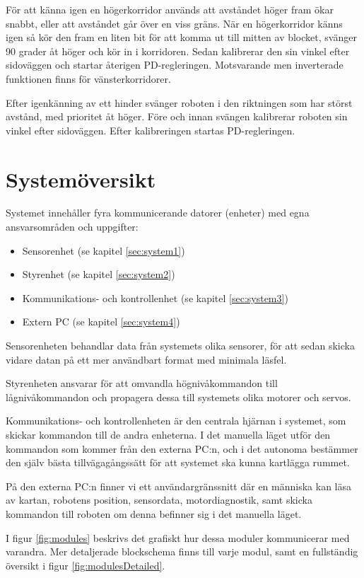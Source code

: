 \documentclass[a4paper,11pt]{article}
\begin{document}
För att känna igen en högerkorridor används att avståndet höger fram ökar snabbt, eller att avståndet går över en viss gräns. När en högerkorridor känns igen så kör den fram en liten bit för att komma ut till mitten av blocket, svänger 90 grader åt höger och kör in i korridoren. Sedan kalibrerar den sin vinkel efter sidoväggen och startar återigen PD-regleringen. Motsvarande men inverterade funktionen finns för vänsterkorridorer.

Efter igenkänning av ett hinder svänger roboten i den riktningen som har störst avstånd, med prioritet åt höger. Före och innan svängen kalibrerar roboten sin vinkel efter sidoväggen. Efter kalibreringen startas PD-regleringen.

\clearpage
\section{Systemöversikt}
Systemet innehåller fyra kommunicerande datorer (enheter) med egna ansvarsområden och uppgifter:
\begin{itemize}
\item Sensorenhet (se kapitel \ref{sec:system1})
\item Styrenhet (se kapitel \ref{sec:system2})
\item Kommunikations- och kontrollenhet (se kapitel \ref{sec:system3})
\item Extern PC (se kapitel \ref{sec:system4})
\end{itemize}

Sensorenheten behandlar data från systemets olika sensorer, för att sedan skicka vidare datan på ett mer användbart format med minimala läsfel.

Styrenheten ansvarar för att omvandla högnivåkommandon till lågnivåkommandon och propagera dessa till systemets olika motorer och servos.

Kommunikations- och kontrollenheten är den centrala hjärnan i systemet, som skickar kommandon till de andra enheterna. I det manuella läget utför den kommandon som kommer från den externa PC:n, och i det autonoma bestämmer den själv bästa tillvägagångssätt för att systemet ska kunna kartlägga rummet.

På den externa PC:n finner vi ett användargränssnitt där en människa kan läsa av kartan, robotens position, sensordata, motordiagnostik, samt skicka kommandon till roboten om denna befinner sig i det manuella läget.

I figur \ref{fig:modules} beskrivs det grafiskt hur dessa moduler kommunicerar med varandra. Mer detaljerade blockschema finns till varje modul, samt en fullständig översikt i figur \ref{fig:modulesDetailed}.
\end{document}
